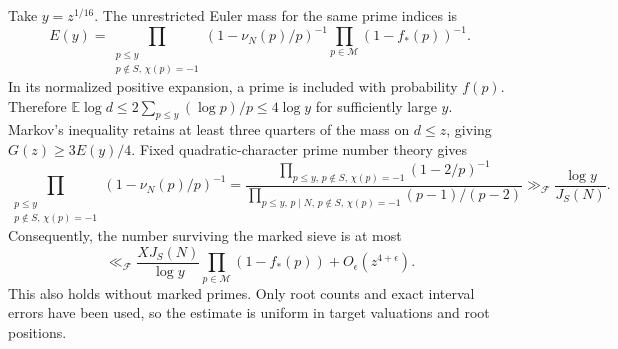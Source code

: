 Take $y=z^{1/16}$.  The unrestricted Euler mass for the same prime
indices is
\[
 E(y)=\prod_{\substack{p\le y\\p\notin S,\,\chi(p)=-1}}
                   (1-\nu_N(p)/p)^{-1}
       \prod_{p\in\mathcal M}(1-f_*(p))^{-1}.
\]
In its normalized positive expansion, a prime is included with
probability $f(p)$.  Therefore
$\mathbb E\log d\le2\sum_{p\le y}(\log p)/p\le4\log y$
for sufficiently large $y$.  Markov's inequality retains at least
three quarters of the mass on $d\le z$, giving $G(z)\ge3E(y)/4$.
Fixed quadratic-character prime number theory gives
\[
 \prod_{\substack{p\le y\\p\notin S,\,\chi(p)=-1}}
                 (1-\nu_N(p)/p)^{-1}
 =\frac{\displaystyle\prod_{p\le y,\,p\notin S,\,\chi(p)=-1}
                           (1-2/p)^{-1}}
        {\displaystyle\prod_{p\le y,\,p\mid N,\,p\notin S,\,\chi(p)=-1}
                           (p-1)/(p-2)}
 \gg_{\mathcal F}\frac{\log y}{J_S(N)}.
\]
Consequently, the number surviving the marked sieve is at most
\begin{equation}\label{eq:norm-marked-sieve}
 \ll_{\mathcal F}
 \frac{XJ_S(N)}{\log y}
                \prod_{p\in\mathcal M}(1-f_*(p))
                +O_\epsilon(z^{4+\epsilon}).
\end{equation}
This also holds without marked primes.  Only root counts and exact
interval errors have been used, so the estimate is uniform in target
valuations and root positions.

